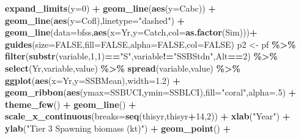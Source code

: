 \documentclass[]{article}
\newenvironment{Shaded}{\begin{snugshade}}{\end{snugshade}}
\newcommand{\DataTypeTok}[1]{\textcolor[rgb]{0.13,0.29,0.53}{#1}}
\newcommand{\DecValTok}[1]{\textcolor[rgb]{0.00,0.00,0.81}{#1}}
\newcommand{\FloatTok}[1]{\textcolor[rgb]{0.00,0.00,0.81}{#1}}
\newcommand{\KeywordTok}[1]{\textcolor[rgb]{0.13,0.29,0.53}{\textbf{#1}}}
\newcommand{\NormalTok}[1]{#1}
\newcommand{\OperatorTok}[1]{\textcolor[rgb]{0.81,0.36,0.00}{\textbf{#1}}}
\newcommand{\OtherTok}[1]{\textcolor[rgb]{0.56,0.35,0.01}{#1}}
\newcommand{\StringTok}[1]{\textcolor[rgb]{0.31,0.60,0.02}{#1}}
\begin{document}
\begin{Shaded}
\begin{Highlighting}[]
\StringTok{    }\KeywordTok{expand\_limits}\NormalTok{(}\DataTypeTok{y=}\DecValTok{0}\NormalTok{) }\OperatorTok{+}
\StringTok{    }\KeywordTok{geom\_line}\NormalTok{(}\KeywordTok{aes}\NormalTok{(}\DataTypeTok{y=}\NormalTok{Cabc)) }\OperatorTok{+}\StringTok{ }\KeywordTok{geom\_line}\NormalTok{(}\KeywordTok{aes}\NormalTok{(}\DataTypeTok{y=}\NormalTok{Cofl),}\DataTypeTok{linetype=}\StringTok{"dashed"}\NormalTok{) }\OperatorTok{+}\StringTok{ }\KeywordTok{geom\_line}\NormalTok{(}\DataTypeTok{data=}\NormalTok{bfss,}\KeywordTok{aes}\NormalTok{(}\DataTypeTok{x=}\NormalTok{Yr,}\DataTypeTok{y=}\NormalTok{Catch,}\DataTypeTok{col=}\KeywordTok{as.factor}\NormalTok{(Sim)))}\OperatorTok{+}\StringTok{ }\KeywordTok{guides}\NormalTok{(}\DataTypeTok{size=}\OtherTok{FALSE}\NormalTok{,}\DataTypeTok{fill=}\OtherTok{FALSE}\NormalTok{,}\DataTypeTok{alpha=}\OtherTok{FALSE}\NormalTok{,}\DataTypeTok{col=}\OtherTok{FALSE}\NormalTok{) }
\NormalTok{  p2 \textless{}{-}}\StringTok{ }\NormalTok{pf }\OperatorTok{\%\textgreater{}\%}\StringTok{ }\KeywordTok{filter}\NormalTok{(}\KeywordTok{substr}\NormalTok{(variable,}\DecValTok{1}\NormalTok{,}\DecValTok{1}\NormalTok{)}\OperatorTok{==}\StringTok{"S"}\NormalTok{,variable}\OperatorTok{!=}\StringTok{"SSBStdn"}\NormalTok{,Alt}\OperatorTok{==}\DecValTok{2}\NormalTok{) }\OperatorTok{\%\textgreater{}\%}\StringTok{ }\KeywordTok{select}\NormalTok{(Yr,variable,value) }\OperatorTok{\%\textgreater{}\%}\StringTok{ }\KeywordTok{spread}\NormalTok{(variable,value) }\OperatorTok{\%\textgreater{}\%}
\StringTok{    }\KeywordTok{ggplot}\NormalTok{(}\KeywordTok{aes}\NormalTok{(}\DataTypeTok{x=}\NormalTok{Yr,}\DataTypeTok{y=}\NormalTok{SSBMean),}\DataTypeTok{width=}\FloatTok{1.2}\NormalTok{) }\OperatorTok{+}\StringTok{ }\KeywordTok{geom\_ribbon}\NormalTok{(}\KeywordTok{aes}\NormalTok{(}\DataTypeTok{ymax=}\NormalTok{SSBUCI,}\DataTypeTok{ymin=}\NormalTok{SSBLCI),}\DataTypeTok{fill=}\StringTok{"coral"}\NormalTok{,}\DataTypeTok{alpha=}\NormalTok{.}\DecValTok{5}\NormalTok{) }\OperatorTok{+}\StringTok{ }\KeywordTok{theme\_few}\NormalTok{() }\OperatorTok{+}\StringTok{ }\KeywordTok{geom\_line}\NormalTok{() }\OperatorTok{+}
\StringTok{    }\KeywordTok{scale\_x\_continuous}\NormalTok{(}\DataTypeTok{breaks=}\KeywordTok{seq}\NormalTok{(thisyr,thisyr}\OperatorTok{+}\DecValTok{14}\NormalTok{,}\DecValTok{2}\NormalTok{))  }\OperatorTok{+}\StringTok{  }\KeywordTok{xlab}\NormalTok{(}\StringTok{"Year"}\NormalTok{) }\OperatorTok{+}\StringTok{ }\KeywordTok{ylab}\NormalTok{(}\StringTok{"Tier 3 Spawning biomass (kt)"}\NormalTok{) }\OperatorTok{+}\StringTok{ }\KeywordTok{geom\_point}\NormalTok{() }\OperatorTok{+}\StringTok{ }

\end{Highlighting}
\end{Shaded}
\end{document}
